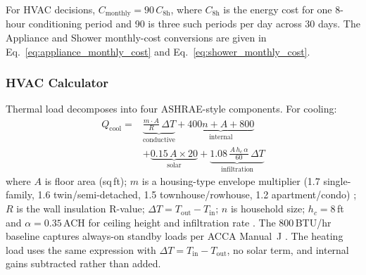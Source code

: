\documentclass[a4paper,fleqn]{cas-dc}
\begin{document}
\noindent For HVAC decisions, $C_{\mathrm{monthly}} = 90\,C_{\mathrm{8h}}$, where $C_{\mathrm{8h}}$ is the energy cost for one 8-hour conditioning period and 90 is three such periods per day across 30 days. The Appliance and Shower monthly-cost conversions are given in Eq.~\ref{eq:appliance_monthly_cost} and Eq.~\ref{eq:shower_monthly_cost}.

\subsubsection{HVAC Calculator}
Thermal load decomposes into four ASHRAE-style components. For cooling:
\begin{equation}
\begin{split}
  Q_{\mathrm{cool}} ={} &
    \underbrace{\frac{m \cdot A}{R}\,\Delta T}_{\text{conductive}}
    +\underbrace{400n + A + 800}_{\text{internal}} \\
    &+\underbrace{0.15\,A \times 20}_{\text{solar}}
    +\underbrace{1.08\,\frac{A\, h_c\, \alpha}{60}\,\Delta T}_{\text{infiltration}}
\end{split}
  \label{eq:hvac_cooling_load}
\end{equation}
\noindent where $A$ is floor area (sq\,ft); $m$ is a housing-type envelope multiplier (1.7 single-family, 1.6 twin/semi-detached, 1.5 townhouse/rowhouse, 1.2 apartment/condo) \citep{accamanualj}; $R$ is the wall insulation R-value; $\Delta T = T_{\mathrm{out}} - T_{\mathrm{in}}$; $n$ is household size; $h_c = 8$\,ft and $\alpha = 0.35$\,ACH for ceiling height and infiltration rate \citep{polly2011}. The 800\,BTU/hr baseline captures always-on standby loads per ACCA Manual~J \citep{accamanualj}. The heating load uses the same expression with $\Delta T = T_{\mathrm{in}} - T_{\mathrm{out}}$, no solar term, and internal gains subtracted rather than added.
\end{document}
